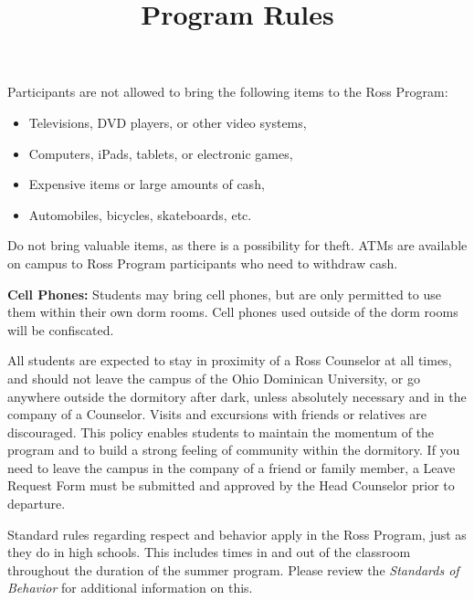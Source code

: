 \documentclass{ross}
\title{Program Rules}
\begin{document}
\maketitle

Participants are not allowed to bring the following items to the Ross
Program:
\begin{itemize}
\item Televisions, DVD players, or other video systems,
\item Computers, iPads, tablets, or electronic games,
\item Expensive items or large amounts of cash,
\item Automobiles, bicycles, skateboards, etc.
\end{itemize}

Do not bring valuable items, as there is a possibility for theft. ATMs
are available on campus to Ross Program participants who need to
withdraw cash.

\textbf{Cell Phones:} Students may bring cell phones, but are only
permitted to use them within their own dorm rooms.  Cell phones used
outside of the dorm rooms will be confiscated.

All students are expected to stay in proximity of a Ross Counselor at
all times, and should not leave the campus of the Ohio Dominican University, or go anywhere outside
the dormitory after dark, unless absolutely necessary and in the
company of a Counselor.  Visits and excursions with friends or
relatives are discouraged.  This policy enables students to maintain
the momentum of the program and to build a strong feeling of community
within the dormitory.  If you need to leave the campus in the company
of a friend or family member, a Leave Request Form must be submitted
and approved by the Head Counselor prior to departure.

Standard rules regarding respect and behavior apply in the Ross
Program, just as they do in high schools. This includes times in and
out of the classroom throughout the duration of the summer
program. Please review the \textit{Standards of Behavior} for
additional information on this.
\end{document}
